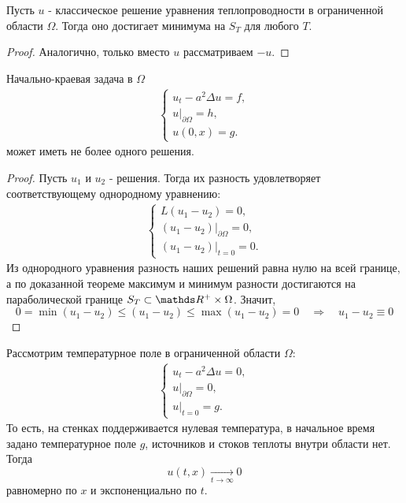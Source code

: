 \begin{corollary}
Пусть $u$ - классическое решение уравнения теплопроводности в ограниченной области $\Omega$. Тогда оно достигает минимума на $S_T$ для любого $T$.
\end{corollary}
\begin{proof}
Аналогично, только вместо $u$ рассматриваем $-u$.

\end{proof}

\begin{corollary}[Единственность]
Начально-краевая задача в $\Omega$
\begin{gather*}
	\begin{cases*}
		u_t - a^2 \Delta u = f, \\
		u \Big\rvert_{\partial \Omega} = h, \\
		u(0, x) = g.
	\end{cases*}
\end{gather*}
может иметь не более одного решения.
\end{corollary}
\begin {proof}
Пусть $u_1$ и $u_2$ - решения. Тогда их разность удовлетворяет соответствующему однородному уравнению:
\begin{gather*}
	\begin{cases*}
		L(u_1 - u_2) = 0, \\
		(u_1 - u_2) \Big\rvert_{\partial \Omega} = 0, \\
		(u_1 - u_2) \Big\rvert_{t = 0} = 0.
	\end{cases*}
\end{gather*}
Из однородного уравнения разность наших решений равна нулю на всей границе, а по доказанной теореме максимум и минимум разности достигаются на параболической границе $S_T \subset \real^+ \times \Omega$. Значит,
$$0 = \min (u_1 - u_2) \leq (u_1 - u_2) \leq \max (u_1 - u_2) = 0 \quad \Rightarrow \quad u_1 - u_2 \equiv 0$$

\end{proof}
\begin{corollary} Рассмотрим температурное поле в ограниченной области $\Omega$:
\begin{gather*}
	\begin{cases*}
		u_t - a^2 \Delta u = 0, \\
		u \Big\rvert_{\partial \Omega} = 0, \\
		u \Big\rvert_{t = 0} = g.
	\end{cases*}
\end{gather*}
То есть, на стенках поддерживается нулевая температура, в начальное время задано температурное поле $g$, источников и стоков теплоты внутри области нет. Тогда
$$ u(t,x) \xrightarrow[t \to \infty]{} 0$$
равномерно по $x$ и экспоненциально по $t$.
\end{corollary}
